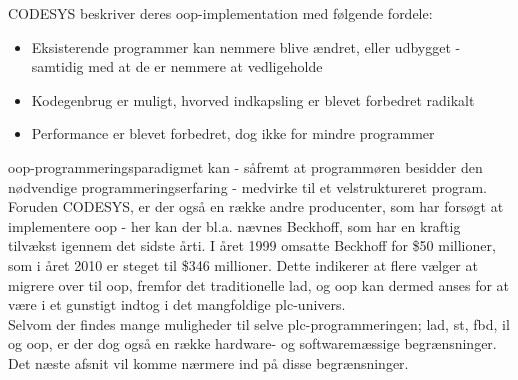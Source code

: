 
\noindent CODESYS beskriver deres \gls{oop}-implementation med følgende fordele\cite{codesys-oop-benefits}:
\begin{itemize}
\item Eksisterende programmer kan nemmere blive ændret, eller udbygget - samtidig med at de er nemmere at vedligeholde
\item Kodegenbrug er muligt, hvorved indkapsling er blevet forbedret radikalt
\item Performance er blevet forbedret, dog ikke for mindre programmer
\end{itemize}

\noindent\gls{oop}-programmeringsparadigmet kan - såfremt at programmøren besidder den nødvendige programmeringserfaring - medvirke til et velstruktureret program. Foruden CODESYS, er der også en række andre producenter, som har forsøgt at implementere \gls{oop} - her kan der bl.a. nævnes Beckhoff, som har en kraftig tilvækst igennem det sidste årti. I året 1999 omsatte Beckhoff for \$50 millioner, som i året 2010 er steget til \$346 millioner. Dette indikerer at flere vælger at migrere over til \gls{oop}, fremfor det traditionelle \gls{lad}, og \gls{oop} kan dermed anses for at være i et gunstigt indtog i det mangfoldige \gls{plc}-univers\cite{beckhoff-sold}. \\

\noindent Selvom der findes mange muligheder til selve \gls{plc}-programmeringen; \gls{lad}, \gls{st}, \gls{fbd}, \gls{il} og \gls{oop}, er der dog også en række hardware- og softwaremæssige begrænsninger. Det næste afsnit vil komme nærmere ind på disse begrænsninger.

